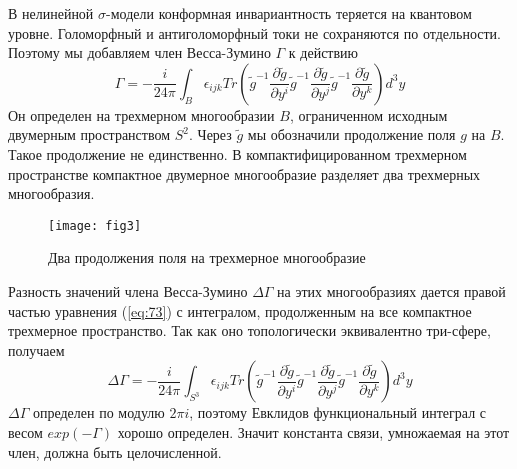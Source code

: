 В нелинейной $\sigma$-модели конформная инвариантность теряется на квантовом уровне.
Голоморфный и антиголоморфный токи не сохраняются по отдельности.
Поэтому мы добавляем член Весса-Зумино $\Gamma$ к действию
\begin{equation}
  \label{eq:73}
\Gamma= - \frac{i }{24\pi} \int_{B}\epsilon_{ijk} Tr\left(
    \tilde g^{-1}\frac{\partial \tilde g}{\partial y^i}
      \tilde g^{-1}\frac{\partial \tilde g}{\partial y^j}
      \tilde g^{-1}\frac{\partial \tilde g}{\partial y^k}\right) d^3y
\end{equation}
Он определен на трехмерном многообразии $B$, ограниченном исходным двумерным пространством $S^{2}$.
Через $\tilde{g}$ мы обозначили продолжение поля $g$ на $B$. Такое продолжение не единственно. В
компактифицированном трехмерном пространстве компактное двумерное многообразие разделяет два
трехмерных многообразия.
\begin{figure}[h]
 \centering
  \texttt{[image: fig3]}  
  \caption{Два продолжения поля на трехмерное многообразие}
  \label{fig:1}
\end{figure}

Разность значений члена Весса-Зумино $\Delta\Gamma$ на этих многообразиях
дается правой частью уравнения (\ref{eq:73}) с интегралом, продолженным на все компактное трехмерное
пространство. Так как оно топологически эквивалентно три-сфере, получаем
\begin{equation}
  \label{eq:75} \Delta\Gamma= - \frac{i }{24\pi} \int_{S^3}\epsilon_{ijk} Tr\left( \tilde
g^{-1}\frac{\partial \tilde g}{\partial y^i} \tilde g^{-1}\frac{\partial \tilde g}{\partial y^j}
\tilde g^{-1}\frac{\partial \tilde g}{\partial y^k}\right) d^3y
\end{equation}
$\Delta\Gamma$ определен по модулю $2\pi i$, поэтому Евклидов функциональный интеграл
с весом $exp(-\Gamma)$ хорошо определен. Значит константа связи, умножаемая на этот член, должна
быть целочисленной.

